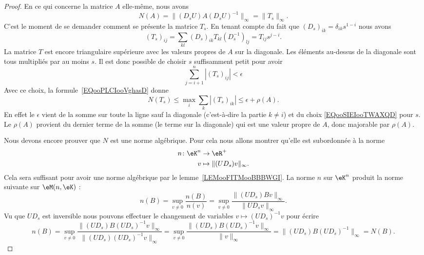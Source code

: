 \begin{proof}
    En ce qui concerne la matrice \( A\) elle-même, nous avons
    \begin{equation}
        N(A)=\| (D_sU)A(D_sU)^{-1} \|_{\infty}=\| T_s \|_{\infty}.
    \end{equation}
    C'est le moment de se demander comment se présente la matrice \( T_s\). En tenant compte du fait que \( (D_s)_{ik}=\delta_{ik}s^{1-i}\) nous avons
    \begin{equation}
        (T_s)_{ij}=\sum_{kl}(D_s)_{ik}T_{kl}(D^{-1}_s)_{lj}=T_{ij}s^{j-i}.
    \end{equation}
    La matrice \( T\) est encore triangulaire supérieure avec les valeurs propres de \( A\) sur la diagonale. Les éléments au-dessus de la diagonale sont tous multipliés par au moins \( s\). Il est donc possible de choisir \( s\) suffisamment petit pour avoir
    \begin{equation}        \label{EQooSIEIooTWAXQD}
        \sum_{j=i+1}^n| (T_s)_{ij} |<\epsilon
    \end{equation}
    Avec ce choix, la formule~\ref{EQooPLCIooVghasD} donne
    \begin{equation}
        N(T_s)\leq\max_i\sum_k| (T_s)_{ik} |\leq \epsilon+\rho(A).
    \end{equation}
    En effet le \( \epsilon\) vient de la somme sur toute la ligne sauf la diagonale (c'est-à-dire la partie \( k\neq i\)) et du choix \eqref{EQooSIEIooTWAXQD} pour \( s\). Le \( \rho(A)\) provient du dernier terme de la somme (le terme sur la diagonale) qui est une valeur propre de \( A\), donc majorable par \( \rho(A)\).

    Nous devons encore prouver que \( N\) est une norme algébrique. Pour cela nous allons montrer qu'elle est subordonnée à la norme
    \begin{equation}
        \begin{aligned}
            n\colon \eK^n&\to \eR^+ \\
            v&\mapsto \| (UD_s)v \|_{\infty}.
        \end{aligned}
    \end{equation}
    Cela sera suffisant pour avoir une norme algébrique par le lemme~\ref{LEMooFITMooBBBWGI}. La norme \( n\) sur \( \eK^n\) produit la norme suivante sur \( \eM(n,\eK)\) :
    \begin{equation}
        n(B)=\sup_{v\neq 0}\frac{ n(B) }{ n(v) }=\sup_{v\neq 0}\frac{ \| (UD_s)Bv \|_{\infty} }{ \| UD_sv \|_{\infty} }.
    \end{equation}
    Vu que \( UD_s\) est inversible nous pouvons effectuer le changement de variables \( v\mapsto (UD_s)^{-1} v\) pour écrire
    \begin{equation}
        n(B)=\sup_{v\neq 0}  \frac{  \| (UD_s)B(UD_s)^{-1}v \|_{\infty} }{ \| (UD_s)(UD_s)^{-1}v \|_{\infty} }=\sup_{v\neq 0}\frac{  \| (UD_s)B(UD_s)^{-1}v \|_{\infty} }{ \| v \|_{\infty} }=\| (UD_s)B(UD_s)^{-1} \|_{\infty}=N(B).
    \end{equation}
\end{proof}

